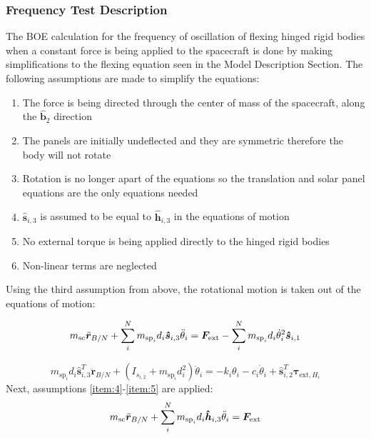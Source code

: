 \subsubsection{Frequency Test Description}

The BOE calculation for the frequency of oscillation of flexing hinged rigid bodies when a constant force is being applied to the spacecraft is done by making simplifications to the flexing equation seen in the Model Description Section. The following assumptions are made to simplify the equations:

\begin{enumerate}
	\item The force is being directed through the center of mass of the spacecraft, along the $\hat{\bm b}_2$ direction
	\item The panels are initially undeflected and they are symmetric therefore the body will not rotate
	\item Rotation is no longer apart of the equations so the translation and solar panel equations are the only equations needed
	\item $\hat{\bm s}_{i,3}$ is assumed to be equal to $\hat{\bm h}_{i,3}$ in the equations of motion \label{item:4}
	\item No external torque is being applied directly to the hinged rigid bodies
	\item Non-linear terms are neglected \label{item:5}
\end{enumerate}
Using the third assumption from above, the rotational motion is taken out of the equations of motion:

\begin{equation}
m_{\text{sc}} \ddot{\bm r}_{B/N}+\sum_{i}^{N}m_{\text{sp}_i} d_i  \bm{\hat{s}}_{i,3}\ddot{\theta}_i = \bm F_{\textnormal{ext}} -\sum_{i}^{N}m_{\text{sp}_i}d_i\dot{\theta}_i^2 \bm{\hat{s}}_{i,1}
\label{eq:Rbddot6}
\end{equation}

\begin{equation}
m_{\text{sp}_i} d_i \hat{\bm s}_{i,3}^{T} \ddot{\bm r}_{B/N} 
+ \left( I_{s_{i,2}} + m_{\text{sp}_i} d_i^{2} \right) \ddot \theta_i 
= - k_i \theta_i - c_i \dot\theta_i + \hat{\bm s}_{i,2}^T \bm \tau_{\text{ext},H_i}  
\label{eq:solar_panel_final9}
\end{equation}
Next, assumptions \ref{item:4}-\ref{item:5} are applied:
\begin{equation}
m_{\text{sc}} \ddot{\bm r}_{B/N}+\sum_{i}^{N}m_{\text{sp}_i} d_i  \bm{\hat{h}}_{i,3}\ddot{\theta}_i = \bm F_{\textnormal{ext}}
\label{eq:Rbddot7}
\end{equation}

